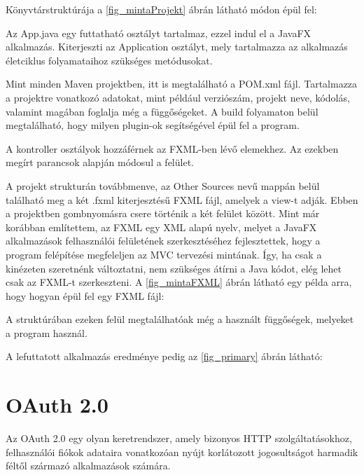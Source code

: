 Könyvtárstruktúrája a \ref{fig_mintaProjekt} ábrán látható módon épül fel: 



Az App.java egy futtatható osztályt tartalmaz, ezzel indul el a JavaFX alkalmazás. Kiterjeszti az Application osztályt, mely tartalmazza az alkalmazás életciklus folyamataihoz szükséges metódusokat. 

Mint minden Maven projektben, itt is megtalálható a POM.xml fájl. Tartalmazza a projektre vonatkozó adatokat, mint például verziószám, projekt neve, kódolás, valamint magában foglalja még a függőségeket. A build folyamaton belül megtalálható, hogy milyen plugin-ok segítségével épül fel a program. 

A kontroller osztályok hozzáférnek az FXML-ben lévő elemekhez. Az ezekben megírt parancsok alapján módosul a felület. 

A projekt strukturán továbbmenve, az Other Sources nevű mappán belül található meg a két .fxml kiterjesztésű FXML fájl, amelyek a view-t adják. Ebben a projektben gombnyomásra csere történik a két felület között. Mint már korábban említettem, az FXML egy XML alapú nyelv, melyet a JavaFX alkalmazások felhasználói felületének szerkesztéséhez fejlesztettek, hogy a program felépítése megfeleljen az MVC tervezési mintának. Így, ha csak a kinézeten szeretnénk változtatni, nem szükséges átírni a Java kódot, elég lehet csak az FXML-t szerkeszteni. A \ref{fig_mintaFXML} ábrán látható egy példa arra, hogy hogyan épül fel egy FXML fájl: 


A struktúrában ezeken felül megtalálhatóak még a használt függőségek, melyeket a program használ. 

A lefuttatott alkalmazás eredménye pedig az \ref{fig_primary} ábrán látható:

%



\section{OAuth 2.0}

Az OAuth 2.0 egy olyan keretrendszer, amely bizonyos HTTP szolgáltatásokhoz, felhasználói fiókok adataira vonatkozóan nyújt korlátozott jogosultságot harmadik féltől származó alkalmazások számára. 


